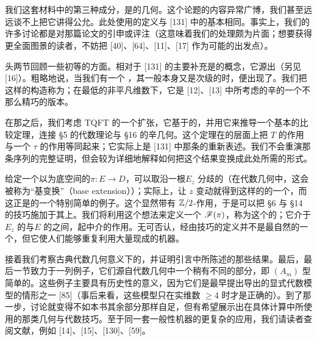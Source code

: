 \part{\trPicardLefschetzTheory}
我们这套材料中的第三种成分，是\trLefschetzFibration{}的\trSymplectic{}几何。这个论题的内容异常广博，我们甚至远远谈不上把它讲得公允。此处使用的定义与 [131] 中的基本相同。事实上，我们的许多讨论都是对那篇论文的引申或评注（这意味着我们的处理颇为片面；想要获得更全面图景的读者，不妨把 [40]、[64]、[11]、[17] 作为可能的出发点）。

头两节回顾一些初等的方面。相对于 [131] 的主要补充是\trMatchingCycle{}的概念，它源出\trDonaldson{}（另见 [16]）。粗略地说，当我们有一个 \trLefschetzFibration，其一般\trFiber{}本身又是次级\trLefschetzFibration{}的\trTotalSpace{}时，\trMatchingCycle{}便出现了。我们把这样的构造称为\trBifibration；在最低的非平凡维数下，它是 [12]、[13] 中所考虑的辛\trBranchedCover{}的一个不那么精巧的版本。

在那之后，我们考虑\trFloer{} TQFT 的一个扩张，它基于\trLefschetzFibration{}的\trHolomorphic\trSection，并用它来推导一个基本的比较定理，连接 §5 的代数理论与 §16 的辛几何。这个定理在\trObject{}的层面上把\trTwistFunctor{} $T$ 的作用与一个\trSymplectic{}\trDehnTwist{} $\tau$ 的作用等同起来；它实际上是 [131] 中那条\trLongExactSequence{}的重新表述。我们不会重演那条序列的完整证明，但会较为详细地解释如何把这个结果变换成此处所需的形式。

给定一个以\trDisk{}为底空间的\trLefschetzFibration{}$\pi\colon E\to D$，可以取沿一根\trFiber{}$E_z$ 分歧的\trDoubleCover（在代数几何中，这会被称为“基变换”（base extension））；实际上，让 $z$ 变动就得到这样的\trCovering{}的一个\trFamily，而这正是\trBifibration{}的一个特别简单的例子。这个\trDoubleCover{}显然带有 $\mathbb{Z}/2$-作用，于是可以把 §6 与 §14 的\trEquivariant{}技巧施加于其上。我们将利用这个想法来定义一个 \trACategory{}$\mathscr{F}(\pi)$，称为这个\trLefschetzFibration{}的\trFukayaCategory；它介于\trFiber{}$E_z$ 的\trFukayaCategory{}与\trTotalSpace{}$E$ 的\trFukayaCategory{}之间，起中介的作用。无可否认，经由\trDoubleCover{}技巧的定义并不是最自然的一个，但它使人们能够重复利用大量现成的机器。

接着我们考察古典代数几何意义下的\trLefschetzPencil，并证明引言中所陈述的那些结果。最后，最后一节致力于一列例子，它们源自代数几何中一个稍有不同的部分，即 $(A_m)$ 型简单\trSingularPoint{}的\trMilnorFibre。这些例子主要具有历史性的意义，因为它们是最早提出导出\trFukayaCategory{}的显式代数模型的情形之一 [85]（事后来看，这些模型只在实维数 $\ge 4$ 时才是正确的）。到了那一步，讨论就变得不如本书其余部分那样自足，但有希望展示出在具体计算中所使用的那类几何与代数技巧。至于同一套一般性机器的更复杂的应用，我们请读者查阅文献，例如 [14]、[15]、[130]、[59]。
